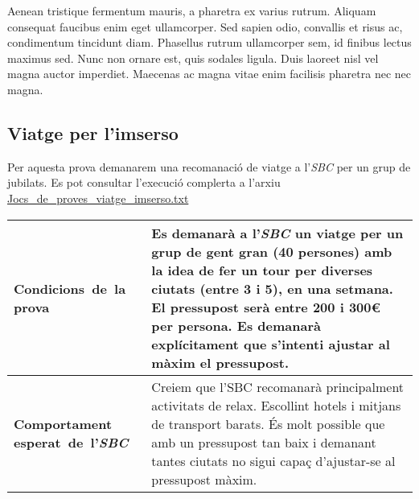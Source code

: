 \documentclass[11pt,a4paper]{article}
\begin{document}
Aenean tristique fermentum mauris, a pharetra ex varius rutrum. Aliquam consequat faucibus enim eget ullamcorper. Sed sapien odio, convallis et risus ac, condimentum tincidunt diam. Phasellus rutrum ullamcorper sem, id finibus lectus maximus sed. Nunc non ornare est, quis sodales ligula. Duis laoreet nisl vel magna auctor imperdiet. Maecenas ac magna vitae enim facilisis pharetra nec nec magna.

\subsection{Viatge per l'imserso}
Per aquesta prova demanarem una recomanació de viatge a l'\emph{SBC} per un grup de jubilats. Es pot consultar l'execució complerta a l'arxiu \url{Jocs_de_proves_viatge_imserso.txt} \\

\noindent
\begin{tabular}{|p{}|p{}|}
\hline
\textbf{\mbox{Condicions de la} \mbox{prova}} & Es demanarà a l'\emph{SBC} un viatge per un grup de gent gran (40 persones) amb la idea de fer un tour per diverses ciutats (entre 3 i 5), en una setmana. El pressupost serà entre 200 i 300\euro{} per persona. Es demanarà explícitament que s'intenti ajustar al màxim el pressupost.\\
\hline
\textbf{Comportament \mbox{esperat de l'\emph{SBC}}} & Creiem que l'SBC recomanarà principalment activitats de relax. Escollint hotels i mitjans de transport barats. És molt possible que amb un pressupost tan baix i demanant tantes ciutats no sigui capaç d'ajustar-se al pressupost màxim.\\
\hline
\end{tabular}
\bigskip
\end{document}
